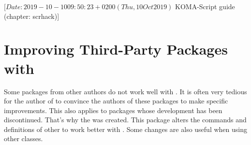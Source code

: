 %
%
%
%
%
%
%
%
% 
%
%
%
%

                 [$Date: 2019-10-10 09:50:23 +0200 (Thu, 10 Oct 2019) $
                  KOMA-Script guide (chapter: scrhack)]


\chapter{Improving Third-Party Packages with }

\BeginIndexGroup
{}
Some packages from other authors do not work well with \KOMAScript{}. It is
often very tedious for the author of \KOMAScript{} to convince the authors of
these packages to make specific improvements. This also applies to packages
whose development has been discontinued. That's why the  was
created. This package alters the commands and definitions of other to work
better with \KOMAScript{}. Some changes are also useful when using other
classes.


